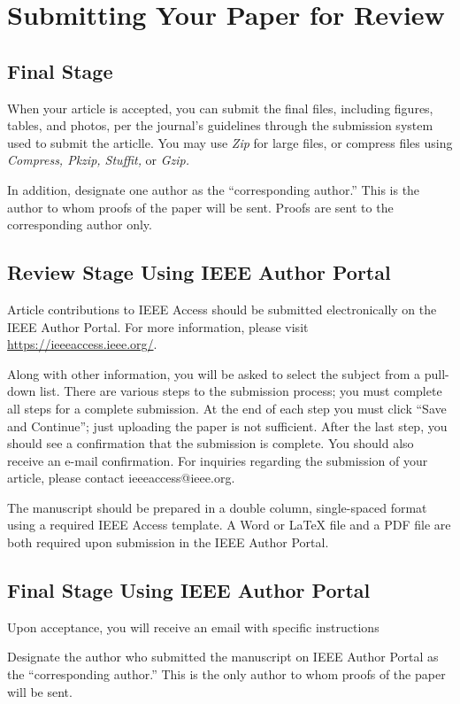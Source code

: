 \documentclass{ieeeaccess}
\begin{document}
\section{\break Submitting Your Paper for Review}

\subsection{Final Stage}
When your article is accepted, you can submit the final files, including figures, tables, and photos, per the journal's guidelines through the submission system used to submit the articlle.
 You may use \emph{Zip} for large files, or compress files using \emph{Compress, Pkzip, Stuffit,} or \emph{Gzip.}

In addition, designate one author as the ``corresponding author.'' This is the author to
whom proofs of the paper will be sent. Proofs are sent to the corresponding
author only.

\subsection{Review Stage Using IEEE Author Portal}
Article contributions to IEEE Access should be submitted electronically on the IEEE Author Portal. For more information, please visit
\underline{https://ieeeaccess.ieee.org/}.

Along with other information, you will be asked to select the subject from a
pull-down list. There are various steps to the
submission process; you must complete all steps for a complete submission.
At the end of each step you must click ``Save and Continue''; just uploading
the paper is not sufficient. After the last step, you should see a
confirmation that the submission is complete. You should also receive an
e-mail confirmation. For inquiries regarding the submission of your article, please contact ieeeaccess@ieee.org.

The manuscript should be prepared in a double column, single-spaced format using a required IEEE Access template.
A Word or LaTeX file and a PDF file are both required upon submission in the IEEE Author Portal.

\subsection{Final Stage Using IEEE Author Portal}
Upon acceptance, you will receive an email with specific instructions

Designate the author who submitted the manuscript on
IEEE Author Portal as the ``corresponding author.'' This is the only
author to whom proofs of the paper will be sent.
\end{document}
